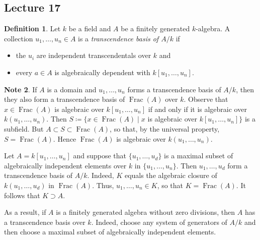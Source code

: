 \documentclass[10pt,letterpaper,cm]{nupset}
\theoremstyle{definition}
\newtheorem{definition}{Definition}[subsection]
\newtheorem{note}[definition]{Note}
\theoremstyle{theorem}
\theoremstyle{remark}
\newcommand{\1}{\mathbf{1}}
\newcommand{\0}{\vec 0}
\DeclareMathOperator{\Frac}{Frac}
\begin{document}
\subsection{Lecture 17}

\begin{definition}
Let $k$ be a field and $A$ be a finitely generated $k$-algebra. A collection $u_1, \ldots, u_n \in A$ is a \textit{transcendence basis of $A/k$} if 
\begin{itemize}
\item the $u_i$ are independent transcendentals over $k$ and
\item every $a\in A$ is algebraically dependent with $k[u_1, \ldots, u_n]$. 
\end{itemize}
\end{definition}

\begin{note}
If $A$ is a domain and $u_1, \ldots, u_n$ forms a transcendence basis of $A/k$, then they also form a transcendence basis of $\Frac(A)$ over $k$. Observe that $x\in \Frac(A)$ is algebraic over $k[u_1, \ldots, u_n]$ if and only if it is algebraic over $k(u_1, \ldots, u_n)$. Then $S\coloneqq  \{x\in \Frac(A) \mid x$ is algebraic over $k[u_1, \ldots, u_n]\}$ is a subfield. But $A \subset S \subset \Frac(A)$, so that, by the universal property, $S= \Frac(A)$. Hence $\Frac(A)$ is algebraic over $k(u_1, \ldots, u_n)$. 

Let $A = k[u_1, \ldots, u_n]$ and suppose that $\{u_1, \ldots, u_d\}$ is a maximal subset of algebraically independent elements over $k$ in $\{u_1, \ldots, u_n\}$. Then $u_1, \ldots, u_d$ form a transcendence basis of $A/k$. Indeed, $K$ equals the algebraic closure of $k(u_1, \ldots, u_d)$ in $\Frac(A)$. Thus, $u_1, \ldots, u_n \in K$, so that $K = \Frac(A)$. It follows that $K \supset A$. 

As a result, if $A$ is a finitely generated algebra without zero divisions, then $A$ has a transcendence basis over $k$. Indeed, choose any system of generators of $A/k$ and then choose a maximal subset of algebraically independent elements. 
\end{note}
\end{document}
